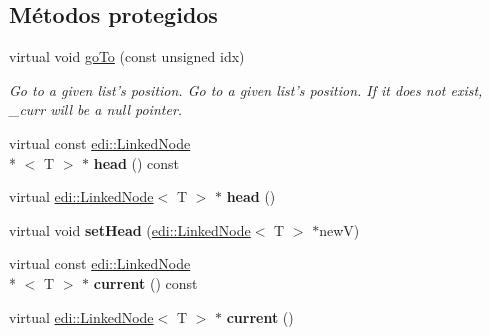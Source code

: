 \subsection*{Métodos protegidos}
\begin{DoxyCompactItemize}
\item 
\hypertarget{classedi_1_1LinkedList_a5aa6f03735bb7cf6b0f4f51952b424bf}{virtual void \hyperlink{classedi_1_1LinkedList_a5aa6f03735bb7cf6b0f4f51952b424bf}{go\+To} (const unsigned idx)}\label{classedi_1_1LinkedList_a5aa6f03735bb7cf6b0f4f51952b424bf}

\begin{DoxyCompactList}\small\item\em Go to a given list's position. Go to a given list's position. If it does not exist, \+\_\+curr will be a null pointer. \end{DoxyCompactList}\item 
\hypertarget{classedi_1_1LinkedList_a4125833127ff248ffc166957c464c4b0}{virtual const \hyperlink{classedi_1_1LinkedNode}{edi\+::\+Linked\+Node}\\*
$<$ T $>$ $\ast$ {\bfseries head} () const }\label{classedi_1_1LinkedList_a4125833127ff248ffc166957c464c4b0}

\item 
\hypertarget{classedi_1_1LinkedList_a180395321c44e0b8fc227fa0eb9b10ff}{virtual \hyperlink{classedi_1_1LinkedNode}{edi\+::\+Linked\+Node}$<$ T $>$ $\ast$ {\bfseries head} ()}\label{classedi_1_1LinkedList_a180395321c44e0b8fc227fa0eb9b10ff}

\item 
\hypertarget{classedi_1_1LinkedList_a1b8521f5cfd6f992c897143b411c4fc2}{virtual void {\bfseries set\+Head} (\hyperlink{classedi_1_1LinkedNode}{edi\+::\+Linked\+Node}$<$ T $>$ $\ast$new\+V)}\label{classedi_1_1LinkedList_a1b8521f5cfd6f992c897143b411c4fc2}

\item 
\hypertarget{classedi_1_1LinkedList_ad5838564bb52150825c8d299627322ae}{virtual const \hyperlink{classedi_1_1LinkedNode}{edi\+::\+Linked\+Node}\\*
$<$ T $>$ $\ast$ {\bfseries current} () const }\label{classedi_1_1LinkedList_ad5838564bb52150825c8d299627322ae}

\item 
\hypertarget{classedi_1_1LinkedList_ac85eb3a63e9bf48c2eb2d8363d1c727c}{virtual \hyperlink{classedi_1_1LinkedNode}{edi\+::\+Linked\+Node}$<$ T $>$ $\ast$ {\bfseries current} ()}\label{classedi_1_1LinkedList_ac85eb3a63e9bf48c2eb2d8363d1c727c}


\end{DoxyCompactItemize}
